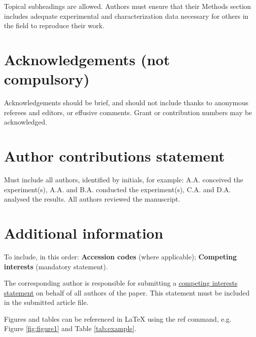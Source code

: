 \documentclass[fleqn,10pt]{wlscirep}
\begin{document}
Topical subheadings are allowed. Authors must ensure that their Methods section includes adequate experimental and characterization data necessary for others in the field to reproduce their work.



\section*{Acknowledgements (not compulsory)}

Acknowledgements should be brief, and should not include thanks to anonymous referees and editors, or effusive comments. Grant or contribution numbers may be acknowledged.

\section*{Author contributions statement}

Must include all authors, identified by initials, for example:
A.A. conceived the experiment(s),  A.A. and B.A. conducted the experiment(s), C.A. and D.A. analysed the results.  All authors reviewed the manuscript. 

\section*{Additional information}

To include, in this order: \textbf{Accession codes} (where applicable); \textbf{Competing interests} (mandatory statement). 

The corresponding author is responsible for submitting a \href{http://www.nature.com/srep/policies/index.html#competing}{competing interests statement} on behalf of all authors of the paper. This statement must be included in the submitted article file.

Figures and tables can be referenced in LaTeX using the ref command, e.g. Figure \ref{fig:figure1} and Table \ref{tab:example}.
\end{document}
